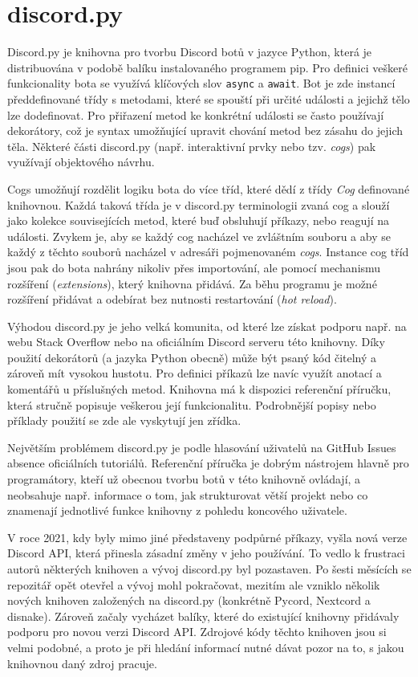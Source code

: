 \documentclass[FM]{tulthesis}
\begin{document}
	\section{discord.py}
	\label{_tag_section_discordpy}
	
	Discord.py je knihovna pro tvorbu Discord botů v jazyce Python, která je distribuována v podobě balíku instalovaného programem pip. Pro definici veškeré funkcionality bota se využívá klíčových slov \verb*|async| a \verb*|await|. Bot je zde instancí předdefinované třídy s metodami, které se spouští při určité události a jejichž tělo lze dodefinovat. Pro přiřazení metod ke konkrétní události se často používají dekorátory, což je syntax umožňující upravit chování metod bez zásahu do jejich těla. Některé části discord.py (např. interaktivní prvky nebo tzv. \textit{cogs}) pak využívají objektového návrhu. 
	
	Cogs umožňují rozdělit logiku bota do více tříd, které dědí z třídy \textit{Cog} definované knihovnou. Každá taková třída je v discord.py terminologii zvaná cog a slouží jako kolekce souvisejících metod, které buď obsluhují příkazy, nebo reagují na události. Zvykem je, aby se každý cog nacházel ve zvláštním souboru a aby se každý z těchto souborů nacházel v adresáři pojmenovaném \textit{cogs}. Instance cog tříd jsou pak do bota nahrány nikoliv přes importování, ale pomocí mechanismu rozšíření (\textit{extensions}), který knihovna přidává. Za běhu programu je možné rozšíření přidávat a odebírat bez nutnosti restartování (\textit{hot reload}).
	
	Výhodou discord.py je jeho velká komunita, od které lze získat podporu např. na webu Stack Overflow nebo na oficiálním Discord serveru této knihovny. Díky použití dekorátorů (a jazyka Python obecně) může být psaný kód čitelný a zároveň mít vysokou hustotu. Pro definici příkazů lze navíc využít anotací a komentářů u příslušných metod. Knihovna má k dispozici referenční příručku, která stručně popisuje veškerou její funkcionalitu. Podrobnější popisy nebo příklady použití se zde ale vyskytují jen zřídka.
	
	Největším problémem discord.py je podle hlasování uživatelů na GitHub \mbox{Issues} absence oficiálních tutoriálů. Referenční příručka je dobrým nástrojem hlavně pro programátory, kteří už obecnou tvorbu botů v této knihovně ovládají, a neobsahuje např. informace o tom, jak strukturovat větší projekt nebo co znamenají jednotlivé funkce knihovny z pohledu koncového uživatele.
	
	V roce 2021, kdy byly mimo jiné představeny podpůrné příkazy, vyšla nová verze Discord API, která přinesla zásadní změny v jeho používání. To vedlo k frustraci autorů některých knihoven a vývoj discord.py byl pozastaven. Po šesti měsících se repozitář opět otevřel a vývoj mohl pokračovat, mezitím ale vzniklo několik nových knihoven založených na discord.py (konkrétně Pycord, Nextcord a disnake). Zároveň začaly vycházet balíky, které do existující knihovny přidávaly podporu pro novou verzi Discord API. Zdrojové kódy těchto knihoven jsou si velmi podobné, a proto je při hledání informací nutné dávat pozor na to, s jakou knihovnou daný zdroj pracuje.
	
\end{document}
